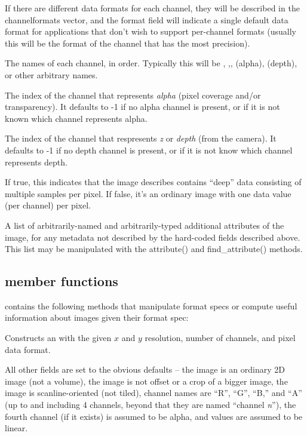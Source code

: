 If there are different data formats for each channel, they will be
described in the {\cf channelformats} vector, and the {\cf format} field
will indicate a single default data format for applications that don't
wish to support per-channel formats (usually this will be the format
of the channel that has the most precision).
\apiend

The names of each channel, in order.  Typically this will be ,
,,  (alpha),  (depth), or other arbitrary
names.
\apiend

The index of the channel that represents \emph{alpha} (pixel coverage
and/or transparency).  It defaults to -1 if no alpha channel is present,
or if it is not known which channel represents alpha.
\apiend

The index of the channel that respresents \emph{z} or \emph{depth} (from
the camera).  It defaults to -1 if no depth channel is present, or if it
is not know which channel represents depth.
\apiend

If {\cf true}, this indicates that the image describes contains ``deep''
data consisting of multiple samples per pixel.  If {\cf false}, it's an
ordinary image with one data value (per channel) per pixel.
\apiend

A list of arbitrarily-named and arbitrarily-typed additional attributes
of the image, for any metadata not described by the hard-coded fields
described above.  This list may be manipulated with the {\cf
attribute()} and {\cf find_attribute()} methods.
\apiend

\subsection{\ImageSpec member functions}
\label{sec:ImageSpecMemberFuncs}

\noindent \ImageSpec contains the following methods that
manipulate format specs or compute useful information about images given
their format spec:

Constructs an \ImageSpec with the given $x$ and $y$ resolution, number
of channels, and pixel data format.

All other fields are set to the obvious defaults -- the image is an
ordinary 2D image (not a volume), the image is not offset or a crop of a
bigger image, the image is scanline-oriented (not tiled), channel names
are ``R'', ``G'', ``B,'' and ``A'' (up to and including 4 channels,
beyond that they are named ``channel \emph{n}''), the fourth channel (if
it exists) is assumed to be alpha, and values are assumed to be linear.
\apiend

